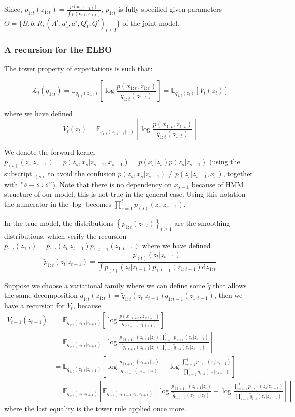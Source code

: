 \documentclass{article}
\newcommand{\1}{\mathbbm{1}}
\newcommand{\rmd}{\ensuremath{\mathrm{d}}}
\newcommand{\expect}[2]{\mathbb{E}_{#1}\left[#2\right]}
\begin{document}
Since, $p_{1:t}( z_{1:t}) = \frac{p(\mathsf{x}_{1:t},  z_{1:t})}{\int p(\mathsf{x}_{1:t},  z'_{1:t})}$, $p_{1:t}$ is fully specified given parameters $\Theta = \{B, b, R, (A^i, a_1^i, a^i, Q_1^i, Q^i)_{i \leq I}\}$ of the joint model. 
\subsubsection*{A recursion for the ELBO}
The tower property of expectations is such that: 

\begin{equation}
    \mathcal{L}_t(q_{1:t}) = \expect{q_{1:t}( z_{1:t})}{\log \frac{p(x_{1:t},z_{1:t})}{q_{1:t}(z_{1:t})}} = \expect{q_{1:t}( z_t)}{V_t(z_{t})}
\end{equation}

where we have defined $$V_t(z_t) = \expect{q_{1:t}( z_{1:t-1}|z_t)}{\log \frac{p(x_{1:t},z_{1:t})}{q_{1:t}(z_{1:t})}}$$

We denote the forward kernel $p_{(s)}(z_s|z_{s-1}) = p(z_s,x_s|z_{s-1}, x_{s-1}) = p(x_s|z_s)p(z_s|z_{s-1})$ (using the subscript $_{(s)}$ to avoid the confusion $p(z_s,x_s|z_{s-1}) \neq p(z_s|z_{s-1},x_s)$, together with $"s = s:s"$). Note that there is no dependency on $x_{s-1}$ because of HMM structure of our model, this is not true in the general case. Using this notation the numerator in the $\log$ becomes $\prod_{s=1}^t p_{(s)}( z_s|z_{s-1})$. 

In the true model, the distributions $\left\{p_{1:t}(z_{1:t})\right\}_{t \geq 1}$ are the smoothing distributions, which verify the recursion $p_{1:t}(z_{1:t}) = \tilde{p}_{1:t}(z_t|z_{t-1}) p_{1:t-1}(z_{1:t-1})$ where we have defined $$\tilde{p}_{1:t}(z_t|z_{t-1}) = \frac{p_{(t)}(z_{t}|z_{t-1})}{\int p_{(t)}(z_{t}|z_{t-1})p_{1:t-1}(z_{1:t-1})\rmd z_{1:t}}$$

Suppose we choose a variational family where we can define some $\tilde{q}$ that allows the same decomposition $q_{1:t}(z_{1:t}) = \tilde{q}_{1:t}(z_t|z_{t-1}) q_{1:t-1}(z_{1:t-1})$, then we have a recursion for $V_t$, because
\begin{align*}
V_{t+1}(z_{t+1}) &= \expect{q_{1:t}(z_{1:t}|z_{t+1})}{\log \frac{p(x_{1:t+1},z_{1:t+1})}{q_{1:t+1}(z_{1:t+1})}} \\
                   &= \expect{q_{1:t}(z_{1:t}|z_{t+1})}{\log\frac{p_{(t+1)}(z_{t+1}|z_t)\prod_{s=1}^t p_{(s)}(z_s|z_{s-1})}{\tilde{q}_{1:t+1}(z_{t+1}|z_t)\prod_{s=1}^t \tilde{q}_{1:s}(z_s|z_{s-1})}}\\
                   &= \expect{q_{1:t}(z_{1:t}|z_{t+1})}{\log\frac{p_{(t+1)}(z_{t+1}|z_t)}{\tilde{q}_{1:t+1}(z_{t+1}|z_t)} + \log\frac{\prod_{s=1}^t p_{(s)}(z_s|z_{s-1})}{\prod_{s=1}^t \tilde{q}_{1:s}(z_s|z_{s-1})}} \\
                   &= \expect{q_{1:t}( z_t|z_{t+1})}{\expect{q_{1:t}(z_{1:t-1}|z_t,z_{t+1})}{
                           \log\frac{p_{(t+1)}(z_{t+1}|z_t)}{\tilde{q}_{1:t+1}(z_{t+1}|z_t)} + \log\frac{\prod_{s=1}^t p_{(s)}(z_s|z_{s-1})}{\prod_{s=1}^t \tilde{q}_{1:s}(z_s|z_{s-1})}}}
\end{align*}
where the last equality is the tower rule applied once more. 
\end{document}
